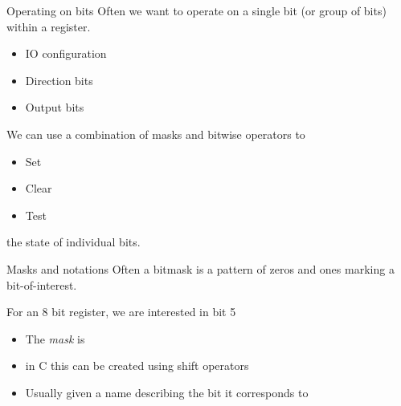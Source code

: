 \documentclass[svgnames,x11names]{beamer}
\begin{document}
\begin{frame}{Operating on bits}
Often we want to operate on a single bit (or group of bits) within a register.
\begin{itemize}
\item IO configuration
\item Direction bits
\item Output bits
\end{itemize}

\pause
We can use a combination of \alert{masks} and \alert{bitwise operators} to
\begin{itemize}
\item Set
\item Clear
\item Test
\end{itemize}
the state of individual bits.
\end{frame}

\begin{frame}[fragile]{Masks and notations}
Often a \alert{bitmask} is a pattern of zeros and ones marking a bit-of-interest.

\begin{example}
  For an \alert{8} bit register, we are interested in bit 5\\[1ex]
  \begin{itemize}
  \item The \emph{mask} is

\item in C this can be created using \alert{shift} operators
  \begin{minipage}{0.8\linewidth}
    \begin{block}{}
    \end{block}
  \end{minipage}
\item Usually given a name describing the bit it corresponds to
  \begin{minipage}{0.8\linewidth}
    \begin{block}{}
    \end{block}
  \end{minipage}
  \end{itemize}
\end{example}
\end{frame}
\end{document}
